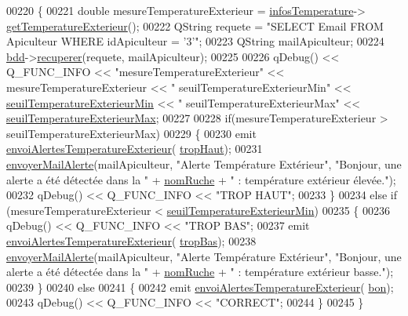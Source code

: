 \begin{DoxyCode}
00220 \{
00221     \textcolor{keywordtype}{double} mesureTemperatureExterieur = \hyperlink{class_alertes_ad02b203545812ad6408befecc94ee0ec}{infosTemperature}->
      \hyperlink{class_infos_temperature_aebb00308151b8b6319732b62bd7b4b55}{getTemperatureExterieur}();
00222     QString requete = \textcolor{stringliteral}{"SELECT Email FROM Apiculteur WHERE idApiculteur = '3'"};
00223     QString mailApiculteur;
00224     \hyperlink{class_alertes_a91e58b69d29922e8e984efb767ae5268}{bdd}->\hyperlink{class_base_de_donnees_a77539baad389f5acf754cd2cd452403e}{recuperer}(requete, mailApiculteur);
00225 
00226     qDebug() << Q\_FUNC\_INFO << \textcolor{stringliteral}{"mesureTemperatureExterieur"} << mesureTemperatureExterieur << \textcolor{stringliteral}{"
      seuilTemperatureExterieurMin"} << \hyperlink{class_alertes_a0898c501edf5f07ac503b31b8a3d2454}{seuilTemperatureExterieurMin} << \textcolor{stringliteral}{"
      seuilTemperatureExterieurMax"} << \hyperlink{class_alertes_a207e0266c68ad378dae846382ba9f9dc}{seuilTemperatureExterieurMax};
00227 
00228     \textcolor{keywordflow}{if}(mesureTemperatureExterieur > seuilTemperatureExterieurMax)
00229     \{
00230         emit \hyperlink{class_alertes_a7b257375a0d8ad5f41abaa572799aae4}{envoiAlertesTemperatureExterieur}(
      \hyperlink{parametres_8h_aaa6de8207c94675264c90b10b613368dabc650d9700ae19f2696e6a6e3f9ab067}{tropHaut});
00231         \hyperlink{class_alertes_a375783502a78109f3323dc1ed90cfdc9}{envoyerMailAlerte}(mailApiculteur, \textcolor{stringliteral}{"Alerte Température Extérieur"}, \textcolor{stringliteral}{"Bonjour, une
       alerte a été détectée dans la "}  + \hyperlink{class_alertes_a212f2a7185bcc7b11f3e54200272bdcf}{nomRuche} +  \textcolor{stringliteral}{" : température extérieur élevée."});
00232         qDebug() << Q\_FUNC\_INFO << \textcolor{stringliteral}{"TROP HAUT"};
00233     \}
00234     \textcolor{keywordflow}{else} \textcolor{keywordflow}{if} (mesureTemperatureExterieur < \hyperlink{class_alertes_a0898c501edf5f07ac503b31b8a3d2454}{seuilTemperatureExterieurMin})
00235     \{
00236         qDebug() << Q\_FUNC\_INFO << \textcolor{stringliteral}{"TROP BAS"};
00237         emit \hyperlink{class_alertes_a7b257375a0d8ad5f41abaa572799aae4}{envoiAlertesTemperatureExterieur}(
      \hyperlink{parametres_8h_aaa6de8207c94675264c90b10b613368da4257e2f8921856770c8266f55c937295}{tropBas});
00238         \hyperlink{class_alertes_a375783502a78109f3323dc1ed90cfdc9}{envoyerMailAlerte}(mailApiculteur, \textcolor{stringliteral}{"Alerte Température Extérieur"}, \textcolor{stringliteral}{"Bonjour, une
       alerte a été détectée dans la "}  + \hyperlink{class_alertes_a212f2a7185bcc7b11f3e54200272bdcf}{nomRuche} +  \textcolor{stringliteral}{" : température extérieur basse."});
00239     \}
00240     \textcolor{keywordflow}{else}
00241     \{
00242         emit \hyperlink{class_alertes_a7b257375a0d8ad5f41abaa572799aae4}{envoiAlertesTemperatureExterieur}(
      \hyperlink{parametres_8h_aaa6de8207c94675264c90b10b613368da5ac8ec3b54d90a07c6bb5a77ef971821}{bon});
00243         qDebug() << Q\_FUNC\_INFO << \textcolor{stringliteral}{"CORRECT"};
00244     \}
00245 \}
\end{DoxyCode}
